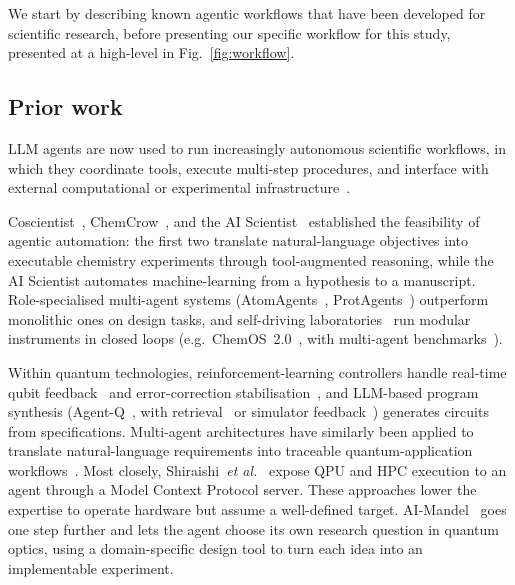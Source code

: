 \documentclass[aps,pra,reprint,amssymb,superscriptaddress,nofootinbib,floatfix]{revtex4-2}
\begin{document}
We start by describing known agentic workflows that have been developed for scientific research, before presenting our specific workflow for this study, presented at a high-level in Fig.~\ref{fig:workflow}. 

\subsection{Prior work}
LLM agents are now used to run increasingly autonomous scientific workflows, in which they coordinate tools, execute multi-step procedures, and interface with external computational or experimental infrastructure~\cite{zheng2025automation}.

Coscientist~\cite{boiko2023coscientist}, ChemCrow~\cite{bran2023chemcrow}, and the AI Scientist~\cite{lu2024aiscientist} established the feasibility of agentic automation: the first two translate natural-language objectives into executable chemistry experiments through tool-augmented reasoning, while the AI Scientist automates machine-learning from a hypothesis to a manuscript.
Role-specialised multi-agent systems (AtomAgents~\cite{ghafarollahi2025atomagents}, ProtAgents~\cite{ghafarollahi2024protagents}) outperform monolithic ones on design tasks, and self-driving laboratories~\cite{tom2024sdl} run modular instruments in closed loops (e.g.\ ChemOS~2.0~\cite{sim2024chemos}, with multi-agent benchmarks~\cite{mandal2025afmbench}).

Within quantum technologies, reinforcement-learning controllers handle real-time qubit feedback~\cite{reuer2023realtime} and error-correction stabilisation~\cite{sivak2025rlqec}, and LLM-based program synthesis (Agent-Q~\cite{jern2025agentq}, with retrieval~\cite{asif2025pennylang} or simulator feedback~\cite{mikuriya2025qcoder}) generates circuits from specifications. Multi-agent architectures have similarly been applied to translate natural-language requirements into traceable quantum-application workflows~\cite{tao2026qpipe}. Most closely, Shiraishi~\emph{et al.}~\cite{shiraishi2026mcp} expose QPU and HPC execution to an agent through a Model Context Protocol server. These approaches lower the expertise to operate hardware but assume a well-defined target. AI-Mandel~\cite{arlt2025aimandel} goes one step further and lets the agent choose its own research question in quantum optics, using a domain-specific design tool to
turn each idea into an implementable experiment.
\end{document}
